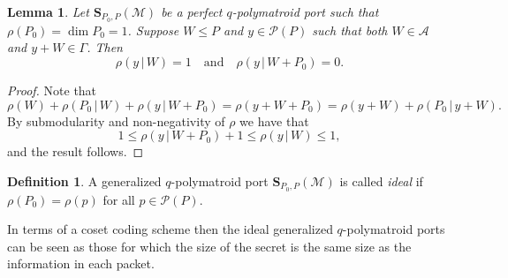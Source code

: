 \documentclass[onecolumn,draftclsnofoot,12pt]{IEEEtran}
\newcommand{\A}{\mathcal{A}}
\renewcommand{\P}{\mathcal{P}}
\renewcommand{\S}{\mathbf{S}}
\newcommand{\M}{\mathcal{M}}
\theoremstyle{plain} %
\newtheorem{lemma}[theorem]{Lemma}
\theoremstyle{definition}
\newtheorem{definition}[theorem]{Definition}
\begin{document}
\begin{lemma}
Let $\S_{P_0,P}(\mathcal{M})$ be a perfect $q$-polymatroid port such that $\rho(P_0) = \dim P_0 =1$. Suppose $W\leq P$ and $y\in \P(P)$ such that both $W\in \A$ and $y+W\in \Gamma$. Then \label{lem:brickell2}
$$
    \rho(y\,|\, W) = 1 \quad \text{and} \quad \rho(y\,|\, W+P_0)=0.
$$
\end{lemma}
\begin{proof} Note that
\[
    \rho(W) + \rho(P_0\,|\, W) + \rho(y\,|\, W+P_0) = \rho(y+W+P_0) = \rho(y+W) + \rho(P_0 \,|\, y+W).
\]
By submodularity and non-negativity of $\rho$ we have that
\[
    1\leq \rho(y\,|\, W+P_0) + 1 \leq  \rho(y\,|\, W) \leq 1,
\]
and the result follows.
\end{proof}
\begin{definition}
A generalized $q$-polymatroid port $\S_{P_0,P}(\M)$ is called \textit{ideal} if $\rho(P_0)= \rho(p)$ for all $p\in \P(P)$.
\end{definition} 
In terms of a coset coding scheme then the ideal generalized $q$-polymatroid ports can be seen as those for which the size of the secret is the same size as the information in each packet.
\end{document}
